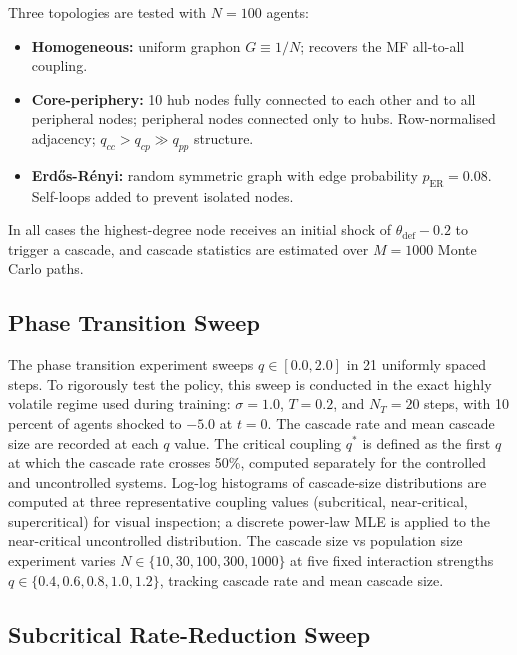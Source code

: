 \documentclass[11pt]{article}
\begin{document}
Three topologies are tested with $N = 100$ agents:
\begin{itemize}
  \item \textbf{Homogeneous:} uniform graphon $G \equiv 1/N$; recovers the MF all-to-all coupling.
  \item \textbf{Core-periphery:} 10 hub nodes fully connected to each other and to all peripheral nodes; peripheral nodes connected only to hubs. Row-normalised adjacency; $q_{cc} > q_{cp} \gg q_{pp}$ structure.
  \item \textbf{Erdős-Rényi:} random symmetric graph with edge probability $p_{\mathrm{ER}} = 0.08$. Self-loops added to prevent isolated nodes.
\end{itemize}
In all cases the highest-degree node receives an initial shock of $\theta_{\mathrm{def}} - 0.2$ to trigger a cascade, and cascade statistics are estimated over $M = 1000$ Monte Carlo paths.

\subsection{Phase Transition Sweep}

The phase transition experiment sweeps $q \in [0.0, 2.0]$ in 21 uniformly spaced steps. To rigorously test the policy, this sweep is conducted in the exact highly volatile regime used during training: $\sigma = 1.0$, $T = 0.2$, and $N_T = 20$ steps, with 10 percent of agents shocked to $-5.0$ at $t = 0$. The cascade rate and mean cascade size are recorded at each $q$ value. The critical coupling $q^*$ is defined as the first $q$ at which the cascade rate crosses 50\%, computed separately for the controlled and uncontrolled systems. Log-log histograms of cascade-size distributions are computed at three representative coupling values (subcritical, near-critical, supercritical) for visual inspection; a discrete power-law MLE \citep{clauset2009powerlaw} is applied to the near-critical uncontrolled distribution. The cascade size vs population size experiment varies $N \in \{10, 30, 100, 300, 1000\}$ at five fixed interaction strengths $q \in \{0.4, 0.6, 0.8, 1.0, 1.2\}$, tracking cascade rate and mean cascade size.

\subsection{Subcritical Rate-Reduction Sweep}
\end{document}
